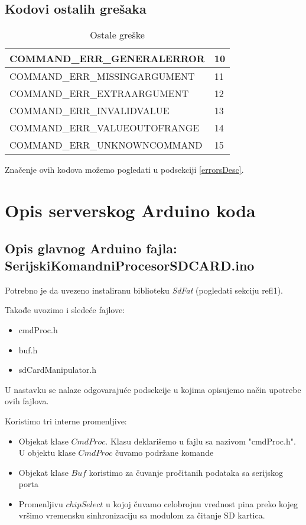 \documentclass[a4paper]{extarticle}
\begin{document}
\subsection{Kodovi ostalih grešaka}

\begin{table}[h]
	\centering
	\begin{tabular}{|l|l|}
		\hline
		COMMAND\_ERR\_GENERALERROR    & 10 \\ \hline
		COMMAND\_ERR\_MISSINGARGUMENT & 11 \\ \hline
		COMMAND\_ERR\_EXTRAARGUMENT   & 12 \\ \hline
		COMMAND\_ERR\_INVALIDVALUE    & 13 \\ \hline
		COMMAND\_ERR\_VALUEOUTOFRANGE & 14 \\ \hline
		COMMAND\_ERR\_UNKNOWNCOMMAND  & 15 \\ \hline
	\end{tabular}
	\caption{Ostale greške}
	\label{tab:my-table}
\end{table}

Značenje ovih kodova možemo pogledati u podsekciji \ref{errorsDesc}.

\section{Opis serverskog Arduino koda}


\subsection{Opis glavnog Arduino fajla: SerijskiKomandniProcesorSDCARD.ino}
\label{Arduinoglavnikod}
Potrebno je da uvezeno instaliranu biblioteku \textit{SdFat} (pogledati sekciju ref{l1}).

Takođe uvozimo i sledeće fajlove:
\begin{itemize}
	\item cmdProc.h
	\item buf.h
	\item sdCardManipulator.h
\end{itemize}
U nastavku se nalaze odgovarajuće podsekcije u kojima opisujemo način upotrebe ovih fajlova.

Koristimo tri interne promenljive: 
\begin{itemize}
	\item Objekat klase $CmdProc$. Klasu deklarišemo u fajlu sa nazivom "cmdProc.h". U objektu klase $CmdProc$ čuvamo podržane komande
	\item Objekat klase $Buf$ koristimo za čuvanje pročitanih podataka sa serijskog porta
	\item Promenljivu $chipSelect$ u kojoj čuvamo celobrojnu vrednost pina preko kojeg vršimo vremensku sinhronizaciju sa modulom za čitanje SD kartica.
\end{itemize}
\end{document}
